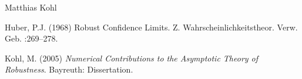 \begin{Author}\relax
Matthias Kohl 
\end{Author}
\begin{References}\relax
Huber, P.J. (1968) Robust Confidence Limits. Z. Wahrscheinlichkeitstheor.
Verw. Geb. :269--278.

Kohl, M. (2005) \emph{Numerical Contributions to the Asymptotic Theory of Robustness}. 
Bayreuth: Dissertation.
\end{References}
\begin{SeeAlso}\relax
{}
\end{SeeAlso}

